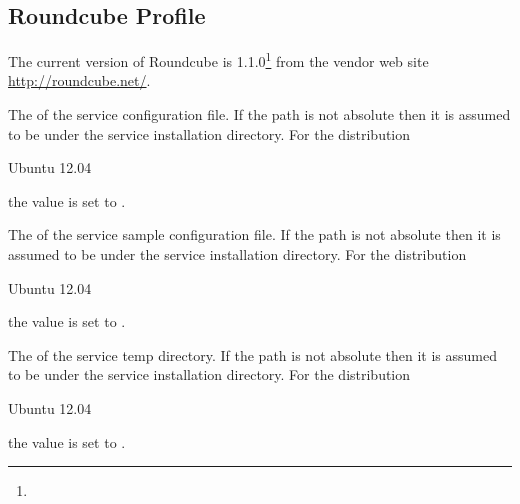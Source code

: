 \label{sec:roundcube_profile}
\subsection{Roundcube Profile}

The current version of Roundcube is 
1.1.0\footnote{} from the vendor web site
\url{http://roundcube.net/}.


The  of the service configuration file. If the path is not absolute
then it is assumed to be under the service installation directory.
For the distribution
\begin{inparaitem}
\item[\TheDistribution{ubuntu}] Ubuntu 12.04
\end{inparaitem}
the value is set to .


The  of the service sample configuration file. If the path is
not absolute then it is assumed to be under the service installation
directory.
For the distribution
\begin{inparaitem}
\item[\TheDistribution{ubuntu}] Ubuntu 12.04
\end{inparaitem}
the value is set to .


The  of the service temp directory. If the path is
not absolute then it is assumed to be under the service installation
directory.
For the distribution
\begin{inparaitem}
\item[\TheDistribution{ubuntu}] Ubuntu 12.04
\end{inparaitem}
the value is set to .

